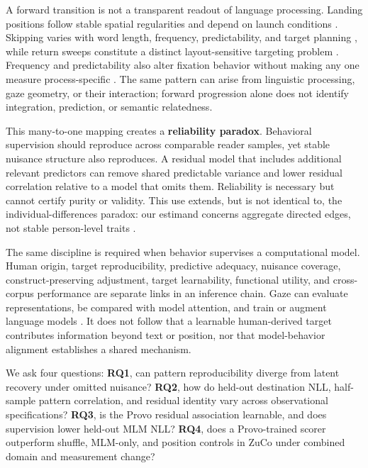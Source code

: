 \documentclass[11pt]{article}
\begin{document}
A forward transition is not a transparent readout of language processing. Landing positions follow stable spatial regularities and depend on launch conditions \citep{rayner1979,mcconkie1988,vitu1990}. Skipping varies with word length, frequency, predictability, and target planning \citep{drieghe2005,rayner2011}, while return sweeps constitute a distinct layout-sensitive targeting problem \citep{slattery2019}. Frequency and predictability also alter fixation behavior without making any one measure process-specific \citep{ehrlich1981,rayner2004frequency,staub2015}. The same pattern can arise from linguistic processing, gaze geometry, or their interaction; forward progression alone does not identify integration, prediction, or semantic relatedness.

This many-to-one mapping creates a \textbf{reliability paradox}. Behavioral supervision should reproduce across comparable reader samples, yet stable nuisance structure also reproduces. A residual model that includes additional relevant predictors can remove shared predictable variance and lower residual correlation relative to a model that omits them. Reliability is necessary but cannot certify purity or validity. This use extends, but is not identical to, the individual-differences paradox: our estimand concerns aggregate directed edges, not stable person-level traits \citep{hedge2018,rouder2019,parsons2019}.

The same discipline is required when behavior supervises a computational model. Human origin, target reproducibility, predictive adequacy, nuisance coverage, construct-preserving adjustment, target learnability, functional utility, and cross-corpus performance are separate links in an inference chain. Gaze can evaluate representations, be compared with model attention, and train or augment language models \citep{sogaard2016,hollenstein2019cognival,eberle2022,deng2023eyettention,deng2023synthetic,deng2024gaze}. It does not follow that a learnable human-derived target contributes information beyond text or position, nor that model-behavior alignment establishes a shared mechanism.

We ask four questions: \textbf{RQ1}, can pattern reproducibility diverge from latent recovery under omitted nuisance? \textbf{RQ2}, how do held-out destination NLL, half-sample pattern correlation, and residual identity vary across observational specifications? \textbf{RQ3}, is the Provo residual association learnable, and does supervision lower held-out MLM NLL? \textbf{RQ4}, does a Provo-trained scorer outperform shuffle, MLM-only, and position controls in ZuCo under combined domain and measurement change?
\end{document}
